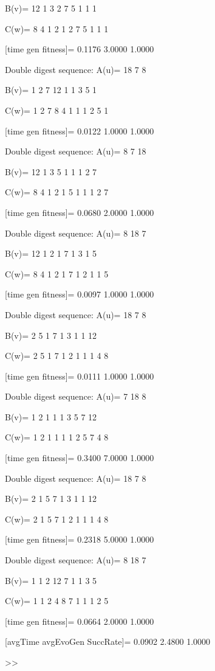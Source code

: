 B(v)=
    12     1     3     2     7     5     1     1     1

C(w)=
     8     4     1     2     1     2     7     5     1     1     1

[time gen fitness]=
    0.1176    3.0000    1.0000

Double digest sequence:
A(u)=
    18     7     8

B(v)=
     1     2     7    12     1     1     3     5     1

C(w)=
     1     2     7     8     4     1     1     1     2     5     1

[time gen fitness]=
    0.0122    1.0000    1.0000

Double digest sequence:
A(u)=
     8     7    18

B(v)=
    12     1     3     5     1     1     1     2     7

C(w)=
     8     4     1     2     1     5     1     1     1     2     7

[time gen fitness]=
    0.0680    2.0000    1.0000

Double digest sequence:
A(u)=
     8    18     7

B(v)=
    12     1     2     1     7     1     3     1     5

C(w)=
     8     4     1     2     1     7     1     2     1     1     5

[time gen fitness]=
    0.0097    1.0000    1.0000

Double digest sequence:
A(u)=
    18     7     8

B(v)=
     2     5     1     7     1     3     1     1    12

C(w)=
     2     5     1     7     1     2     1     1     1     4     8

[time gen fitness]=
    0.0111    1.0000    1.0000

Double digest sequence:
A(u)=
     7    18     8

B(v)=
     1     2     1     1     1     3     5     7    12

C(w)=
     1     2     1     1     1     1     2     5     7     4     8

[time gen fitness]=
    0.3400    7.0000    1.0000

Double digest sequence:
A(u)=
    18     7     8

B(v)=
     2     1     5     7     1     3     1     1    12

C(w)=
     2     1     5     7     1     2     1     1     1     4     8

[time gen fitness]=
    0.2318    5.0000    1.0000

Double digest sequence:
A(u)=
     8    18     7

B(v)=
     1     1     2    12     7     1     1     3     5

C(w)=
     1     1     2     4     8     7     1     1     1     2     5

[time gen fitness]=
    0.0664    2.0000    1.0000

[avgTime  avgEvoGen  SuccRate]=
    0.0902    2.4800    1.0000

>> 